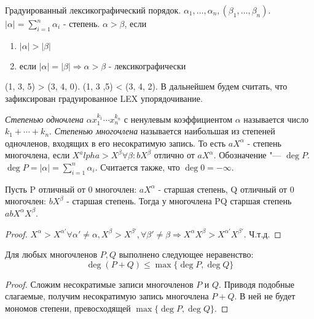 \begin{example}
	Градуированный лексикографический порядок. \(\alpha_1,\ldots, \alpha_n, (\beta_1, \ldots, \beta_n)\). \(|\alpha| = \sum_{i=1}^{n}\alpha_i\) - степень.
	\(\alpha>\beta\), если 
	\begin{enumerate}
		\item \(|\alpha|>|\beta|\)
		\item если \(|\alpha| = |\beta|\Longrightarrow \alpha>\beta\) - лексикографически
	\end{enumerate}
	(1, 3, 5) > (3, 4, 0). (1, 3 ,5) < (3, 4, 2).\newline
	В дальнейшем будем считать, что зафиксирован градуированное LEX упорядочивание.
\end{example}

\begin{definition}
	\textit{Степенью одночлена} $\alpha x_1^{k_1} \dotsm x_n^{k_n}$ с ненулевым коэффициентом $\alpha$ называется число $k_1 + \dotsb + k_n$. \textit{Степенью многочлена} называется наибольшая из степеней одночленов, входящих в его несократимую запись. То есть \(aX^\alpha\) - степень многочлена, если \(X^alpha > X^\beta \forall \beta: bX^\beta\text{ отлично от }aX^\alpha\). Обозначение "--- $\deg{P}$. \(\deg P = |\alpha| = \sum_{i=1}^{n}\alpha_i\). Считается также, что $\deg{0} = -\infty$.
\end{definition}
\begin{proposition}
	Пусть P отличный от 0 многочлен: \(aX^\alpha\) - старшая степень, Q отличный от 0 многочлен: \(bX^\beta\) - старшая степень. Тогда у многочлена PQ старшая степень \(abX^\alpha X^\beta\).
\end{proposition}
\begin{proof}
	\(X^\alpha>X^{\alpha'}\forall \alpha'\ne\alpha, X^\beta>X^{\beta'}, \forall \beta'\ne\beta\Longrightarrow X^\alpha X^\beta>X^{\alpha'}X^{\beta'}\). Ч.т.д.
\end{proof}

\begin{proposition}
	Для любых многочленов $P, Q$ выполнено следующее неравенство:
	\[\deg{(P + Q)} \le \max\{\deg{P}, \deg{Q}\}\]
\end{proposition}

\begin{proof}
	Сложим несократимые записи многочленов $P$ и $Q$. Приводя подобные слагаемые, получим несократимую запись многочлена $P+Q$. В ней не будет мономов степени, превосходящей $\max\{\deg{P}, \deg{Q}\}$.
\end{proof}

